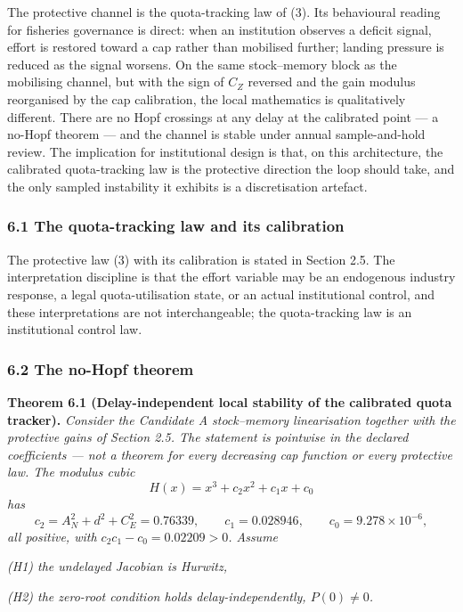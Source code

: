 \documentclass[11pt]{article}
\begin{document}
The protective channel is the quota-tracking law of (3). Its behavioural
reading for fisheries governance is direct: when an institution observes
a deficit signal, effort is restored toward a cap rather than mobilised
further; landing pressure is reduced as the signal worsens. On the same
stock--memory block as the mobilising channel, but with the sign of
\(C_Z\) reversed and the gain modulus reorganised by the cap
calibration, the local mathematics is qualitatively different. There are
no Hopf crossings at any delay at the calibrated point --- a no-Hopf
theorem --- and the channel is stable under annual sample-and-hold
review. The implication for institutional design is that, on this
architecture, the calibrated quota-tracking law is the protective
direction the loop should take, and the only sampled instability it
exhibits is a discretisation artefact.

\subsubsection{6.1 The quota-tracking law and its
calibration}\label{the-quota-tracking-law-and-its-calibration}

The protective law (3) with its calibration is stated in Section 2.5.
The interpretation discipline is that the effort variable may be an
endogenous industry response, a legal quota-utilisation state, or an
actual institutional control, and these interpretations are not
interchangeable; the quota-tracking law is an institutional control law.

\subsubsection{6.2 The no-Hopf theorem}\label{the-no-hopf-theorem}

\textbf{Theorem 6.1 (Delay-independent local stability of the calibrated
quota tracker).} \emph{Consider the Candidate A stock--memory
linearisation together with the protective gains of Section 2.5. The
statement is pointwise in the declared coefficients --- not a theorem
for every decreasing cap function or every protective law. The modulus
cubic} \[H(x) = x^3 + c_2 x^2 + c_1 x + c_0\] \emph{has}
\[c_2 = A_N^2 + d^2 + C_E^2 = 0.76339, \qquad c_1 = 0.028946, \qquad c_0 = 9.278\times10^{-6},\]
\emph{all positive, with \(c_2 c_1 - c_0 = 0.02209 > 0\). Assume}

\emph{(H1) the undelayed Jacobian is Hurwitz,}

\emph{(H2) the zero-root condition holds delay-independently,
\(P(0) \ne 0\).}
\end{document}
